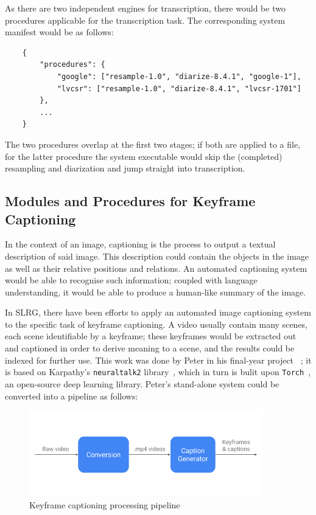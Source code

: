 As there are two independent engines for transcription, there would be two
procedures applicable for the transcription task. The corresponding system
manifest would be as follows:

\begin{lstlisting}
    {
        "procedures": {
            "google": ["resample-1.0", "diarize-8.4.1", "google-1"],
            "lvcsr": ["resample-1.0", "diarize-8.4.1", "lvcsr-1701"]
        },
        ...
    }
\end{lstlisting}

The two procedures overlap at the first two stages; if both are applied to
a file, for the latter procedure the system executable would skip the
(completed) resampling and diarization and jump straight into transcription.

\subsection{Modules and Procedures for Keyframe Captioning}

In the context of an image, captioning is the process to output a textual
description of said image. This description could contain the objects in the
image as well as their relative positions and relations. An automated captioning
system would be able to recognise such information; coupled with language
understanding, it would be able to produce a human-like summary of the image.

In SLRG, there have been efforts to apply an automated image captioning system
to the specific task of keyframe captioning. A video usually contain many scenes,
each scene identifiable by a keyframe; these keyframes would be extracted out and
captioned in order to derive meaning to a scene, and the results could be indexed
for further use. This work was done by Peter in his final-year project~\cite{peter}
; it is based on Karpathy's \texttt{neuraltalk2} library~\cite{nrtalk2}, which
in turn is bulit upon \texttt{Torch}~\cite{th}, an open-source deep learning
library. Peter's stand-alone system could be converted into a pipeline as follows:

\begin{figure}[h]
\begin{center}
    \includegraphics[width=0.9\textwidth]{../images/pipeline_capgen.png}
    \caption{Keyframe captioning processing pipeline}
\end{center}
\end{figure}

